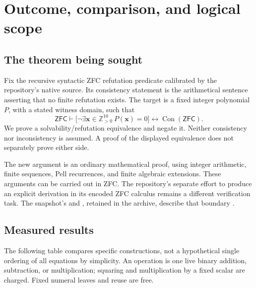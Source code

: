 \documentclass[11pt]{article}
\theoremstyle{remark}
\newcommand{\Zp}{\mathbb Z_{>0}}
\newcommand{\ZFC}{\mathsf{ZFC}}
\newcommand{\Con}{\operatorname{Con}}
\newcommand{\file}[1]{\path{#1}}
\begin{document}
\section{Outcome, comparison, and logical scope}

\subsection{The theorem being sought}
Fix the recursive syntactic ZFC refutation predicate calibrated by the
repository's native source. Its consistency statement is the arithmetical
sentence asserting that no finite refutation exists. The target is a fixed
integer polynomial $P$, with a stated witness domain, such that
\begin{equation}\label{eq:logical-target}
 \ZFC\vdash
 \bigl[\neg\exists\mathbf x\in\Zp^{10}\ P(\mathbf x)=0\bigr]
 \longleftrightarrow \Con(\ZFC).
\end{equation}
We prove a solvability/refutation equivalence and negate it. Neither
consistency nor inconsistency is assumed. A proof of the displayed
equivalence does not separately prove either side.

The new argument is an ordinary mathematical proof, using integer
arithmetic, finite sequences, Pell recurrences, and finite algebraic
extensions. These arguments can be carried out in ZFC. The repository's
separate effort to produce an explicit derivation in its encoded ZFC
calculus remains a different verification task. The snapshot's
\file{STATUS.md} and \file{OBJECT_ZFC.md}, retained in the archive, describe
that boundary \cite{active}.

\subsection{Measured results}
The following table compares specific constructions, not a hypothetical
single ordering of all equations by simplicity. An operation is one live
binary addition, subtraction, or multiplication; squaring and multiplication
by a fixed scalar are charged. Fixed numeral leaves and reuse are free.
\end{document}
